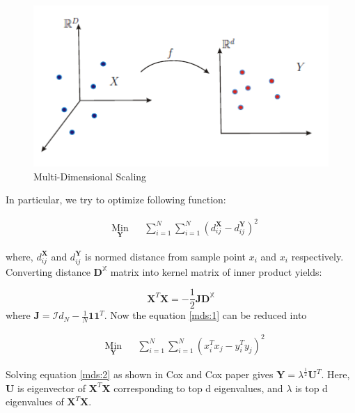 \begin{figure}[ht]
\begin{center}
\includegraphics[width=\textwidth]{./Figures/mds.png}
\caption {Multi-Dimensional Scaling}
\label{mds}
\end{center}
\end{figure}

In particular, we try to optimize following function:

\begin{equation}
\begin{aligned}
& \underset{\mathbf{Y}}{\text{Min}}
&& \sum_{i=1}^{N}\sum_{i=1}^{N}(d_{ij}^{\mathbf{X}}-d_{ij}^{\mathbf{Y}})^{2}
\label{mds:1}
\end{aligned}
\end{equation}

where, $d_{ij}^{\mathbf{X}}$ and $d_{ij}^{\mathbf{Y}}$ is normed distance from sample point $x_{i}$ and $x_{i}$ respectively. Converting distance $\mathbf{D}^{\mathbb{X}}$ matrix into kernel matrix of inner product yields:

\begin{equation}
\mathbf{X}^{T}\mathbf{X} = -\frac{1}{2}\mathbf{J}\mathbf{D}^{\mathbb{X}}
\end{equation}
where $\mathbf{J} = \mathcal{I}d_{N}-\frac{1}{N}\mathbf{1}\mathbf{1}^{T}$. Now the equation \ref{mds:1} can be reduced into

\begin{equation}
\begin{aligned}
& \underset{\mathbf{Y}}{\text{Min}}
&& \sum_{i=1}^{N}\sum_{i=1}^{N}(x_{i}^{T}x_{j}-y_{i}^{T}y_{j})^{2}
\label{mds:2}
\end{aligned}
\end{equation}


Solving equation \ref{mds:2} as shown in Cox and Cox paper\citep{Cox2000} gives $\mathbf{Y}=\lambda^{\frac{1}{2}}\mathbf{U}^{T}$. Here, $\mathbf{U}$ is eigenvector of $\mathbf{X}^{T}\mathbf{X}$ corresponding to top d eigenvalues, and $\lambda$ is top d eigenvalues of $\mathbf{X}^{T}\mathbf{X}$.


